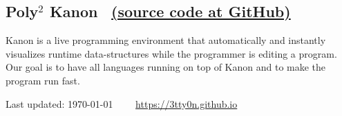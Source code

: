 \documentclass[11pt]{article} %
\newcommand{\伊澤侑祐}{\underline{伊澤侑祐}}
\begin{document}
\subsection*{Poly$^2$ Kanon \,
  \href{https://github.com/prg-titech/Kanon}{(source code at GitHub)}}

Kanon is a live programming environment that automatically and instantly
visualizes runtime data-structures while the programmer is editing a
program. Our goal is to have all languages running on top of Kanon and to make
the program run fast.


\vfill %


\begin{center}
  \scriptsize
  Last updated: \today~~\raisebox{-0.5pt}{\textbullet}~~
  \href{https://3tty0n.github.io}{https://3tty0n.github.io}
\end{center}

\end{document}
